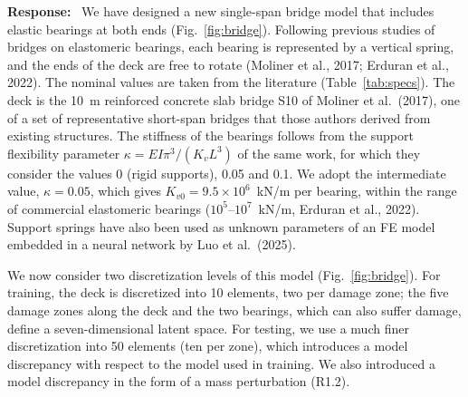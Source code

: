 \documentclass[11pt]{article}
\newenvironment{response}{\par\smallskip\noindent\color{resp}\textbf{Response:}\ }{\par}
\begin{document}
\begin{response}
We have designed a new single-span bridge model that includes elastic bearings at both ends (Fig.~\ref{fig:bridge}).
Following previous studies of bridges on elastomeric bearings, each bearing is represented by a vertical spring, and the
ends of the deck are free to rotate (Moliner et al., 2017; Erduran et al., 2022). The nominal values are taken from the
literature (Table~\ref{tab:specs}). The deck is the 10~m reinforced concrete slab bridge S10 of Moliner et al.\ (2017),
one of a set of representative short-span bridges that those authors derived from existing structures. The stiffness of
the bearings follows from the support flexibility parameter $\kappa=EI\pi^3/(K_vL^3)$ of the same work, for which they
consider the values 0 (rigid supports), 0.05 and 0.1. We adopt the intermediate value, $\kappa=0.05$, which gives
$K_{v0}=9.5\times10^{6}$~kN/m per bearing, within the range of commercial elastomeric bearings ($10^{5}$--$10^{7}$~kN/m,
Erduran et al., 2022). Support springs have also been used as unknown parameters of an FE model embedded in a neural
network by Luo et al.\ (2025).

We now consider two discretization levels of this model (Fig.~\ref{fig:bridge}). For training, the deck is discretized
into 10 elements, two per damage zone; the five damage zones along the deck and the two bearings, which can also suffer
damage, define a seven-dimensional latent space. For testing, we use a much finer discretization into 50 elements (ten per
zone), which introduces a model discrepancy with respect to the model used in training. We also introduced a model
discrepancy in the form of a mass perturbation (R1.2).
\end{response}
\end{document}
